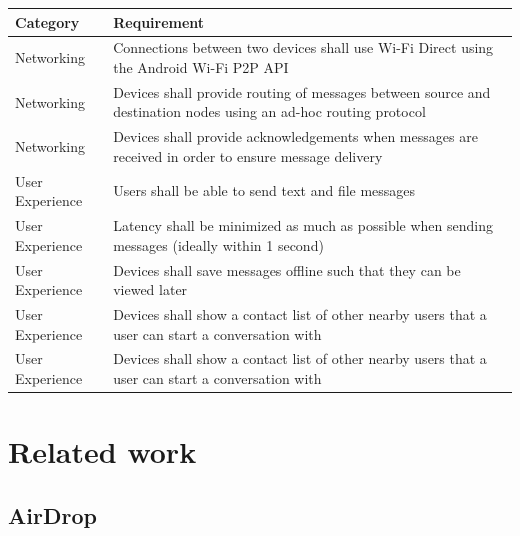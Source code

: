 \documentclass[10pt]{article}
\begin{document}
\begin{center}
    \begin{tabular}{| p{} | p{} |}
        \hline
        Category        & Requirement                                                                                                     \\ \hline
        Networking      & Connections between two devices shall use Wi-Fi Direct using the Android Wi-Fi P2P API                          \\ \hline
        Networking      & Devices shall provide routing of messages between source and destination nodes using an ad-hoc routing protocol \\ \hline
        Networking      & Devices shall provide acknowledgements when messages are received in order to ensure message delivery           \\ \hline
        User Experience & Users shall be able to send text and file messages                                                              \\ \hline
        User Experience & Latency shall be minimized as much as possible when sending messages (ideally within 1 second)                  \\ \hline
        User Experience & Devices shall save messages offline such that they can be viewed later                                          \\ \hline
        User Experience & Devices shall show a contact list of other nearby users that a user can start a conversation with               \\ \hline
        User Experience & Devices shall show a contact list of other nearby users that a user can start a conversation with               \\ \hline
    \end{tabular}
\end{center}

\newpage

\section{Related work}

\subsection{AirDrop}
\end{document}
